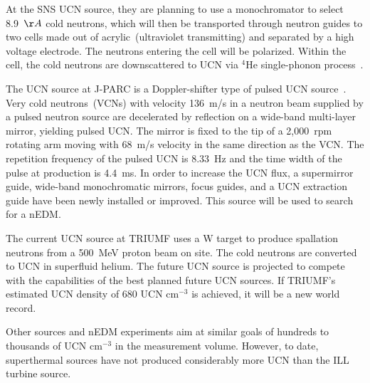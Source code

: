 At the SNS UCN source, they are planning to use a monochromator to
select 8.9~$\AA$ cold neutrons, which will then be transported through
neutron guides to two cells made out of acrylic~(ultraviolet
transmitting) and separated by a high voltage electrode. The neutrons
entering the cell will be polarized. Within the cell, the cold
neutrons are downscattered to UCN via $^4$He single-phonon
process~\cite{kolarkar2010}.


The UCN source at J-PARC is a Doppler-shifter type of pulsed UCN
source~\cite{Imajo2015}. Very cold neutrons~(VCNs) with velocity
136~m/s in a neutron beam supplied by a pulsed neutron source are
decelerated by reflection on a wide-band multi-layer mirror, yielding
pulsed UCN. The mirror is fixed to the tip of a 2,000~rpm rotating arm
moving with 68~m/s velocity in the same direction as the VCN. The
repetition frequency of the pulsed UCN is 8.33~Hz and the time width
of the pulse at production is 4.4~ms. In order to increase the UCN
flux, a supermirror guide, wide-band monochromatic mirrors, focus
guides, and a UCN extraction guide have been newly installed or
improved. This source will be used to search for a nEDM.

The current UCN source at TRIUMF uses a W target to produce spallation
neutrons from a 500~MeV proton beam on site. The cold neutrons are
converted to UCN in superfluid helium.  The future UCN source is
projected to compete with the capabilities of the best planned future
UCN sources. If TRIUMF's estimated UCN density of 680 UCN cm$^{-3}$ is
achieved, it will be a new world record.

Other sources and nEDM experiments aim at similar goals of hundreds to
thousands of UCN cm$^{-3}$ in the measurement volume. However, to
date, superthermal sources have not produced considerably more UCN
than the ILL turbine source.
 

